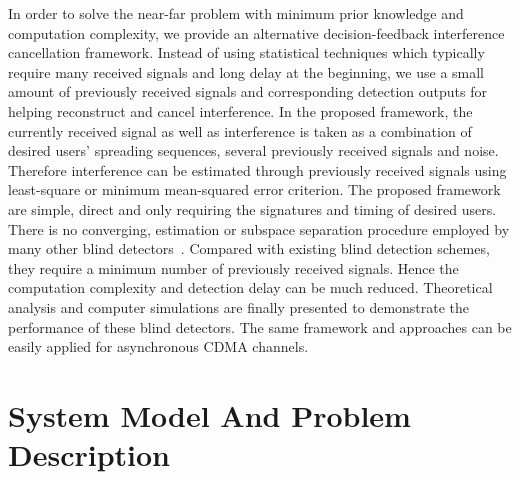 \documentclass[a4paper,10pt,fleqn, twocolumn]{IEEETran}
\begin{document}
In order to solve the near-far problem with minimum prior knowledge and computation complexity, we provide an alternative
decision-feedback interference cancellation framework. Instead of using statistical techniques which typically require many received signals and long delay at the beginning, we use a small amount of previously received signals and corresponding detection outputs for helping reconstruct and cancel interference. In the proposed
framework, the currently received signal as well as interference is taken as a combination of desired users' spreading sequences, several previously received
signals and noise. Therefore interference can be estimated through previously received signals using least-square or minimum mean-squared error criterion.
The proposed framework are simple, direct and only requiring the signatures and timing of desired users. There is no converging, estimation or subspace separation procedure employed by many other
blind detectors~\cite{Madh94,Honi95,Wang98,Wang99}. Compared with existing blind detection schemes, they require a minimum number of previously received signals. Hence the computation complexity and
detection delay can be much reduced. Theoretical analysis and
computer simulations are finally presented to demonstrate the
performance of these blind detectors. The same framework and
approaches can be easily applied for asynchronous CDMA channels.
\section{System Model And Problem Description}
\end{document}

